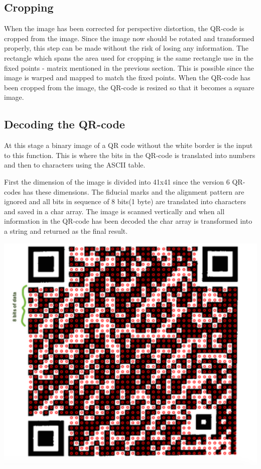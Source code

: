 \documentclass[12pt,a4paper]{article}
\newenvironment{Figure}
  {\par\medskip\noindent\minipage{\linewidth}}
  {\endminipage\par\medskip}
\begin{document}
\subsection{Cropping}
When the image has been corrected for perspective distortion, the QR-code is cropped from the image. Since the image now should be rotated and transformed properly, this step can be made without the risk of losing any information. The rectangle which spans the area used for cropping is the same rectangle use in the fixed points - matrix mentioned in the previous section. This is possible since the image is warped and mapped to match the fixed points. When the QR-code has been cropped from the image, the QR-code is resized so that it becomes a square image. 

\subsection{Decoding the QR-code}
At this stage a binary image of a QR code without the white border is the input to this function. This is where the bits in the QR-code is translated into numbers and then to characters using the ASCII table. 

First the dimension of the image is divided into 41x41 since the version 6 QR-codes has these dimensions. The fiducial marks and the alignment pattern are ignored and all bits in sequence of 8 bits(1 byte) are translated into characters and saved in a char array. The image is scanned vertically and when all information in the QR-code has been decoded the char array is transformed into a string and returned as the final result.
\begin{Figure}
  \centering
    \includegraphics[width=0.8\linewidth]{./img/decoding.png}
\end{Figure}
\end{document}
